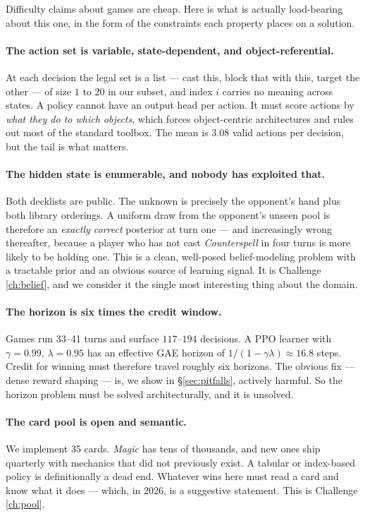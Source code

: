 \documentclass[11pt]{article}
\begin{document}
Difficulty claims about games are cheap. Here is what is actually load-bearing about this one, in the form of the constraints each property places on a solution.

\paragraph{The action set is variable, state-dependent, and object-referential.} At each decision the legal set is a list --- cast this, block that with this, target the other --- of size $1$ to $20$ in our subset, and index $i$ carries no meaning across states. A policy cannot have an output head per action. It must score actions by \emph{what they do to which objects}, which forces object-centric architectures and rules out most of the standard toolbox. The mean is $3.08$ valid actions per decision, but the tail is what matters.

\paragraph{The hidden state is enumerable, and nobody has exploited that.} Both decklists are public. The unknown is precisely the opponent's hand plus both library orderings. A uniform draw from the opponent's unseen pool is therefore an \emph{exactly correct} posterior at turn one --- and increasingly wrong thereafter, because a player who has not cast \textit{Counterspell} in four turns is more likely to be holding one. This is a clean, well-posed belief-modeling problem with a tractable prior and an obvious source of learning signal. It is Challenge \ref{ch:belief}, and we consider it the single most interesting thing about the domain.

\paragraph{The horizon is six times the credit window.} Games run 33--41 turns and surface $117$--$194$ decisions. A PPO learner with $\gamma=0.99$, $\lambda=0.95$ has an effective GAE horizon of $1/(1-\gamma\lambda)\approx16.8$ steps. Credit for winning must therefore travel roughly six horizons. The obvious fix --- dense reward shaping --- is, we show in \S\ref{sec:pitfalls}, actively harmful. So the horizon problem must be solved architecturally, and it is unsolved.

\paragraph{The card pool is open and semantic.} We implement 35 cards. \textit{Magic} has tens of thousands, and new ones ship quarterly with mechanics that did not previously exist. A tabular or index-based policy is definitionally a dead end. Whatever wins here must read a card and know what it does --- which, in 2026, is a suggestive statement. This is Challenge \ref{ch:pool}.
\end{document}
